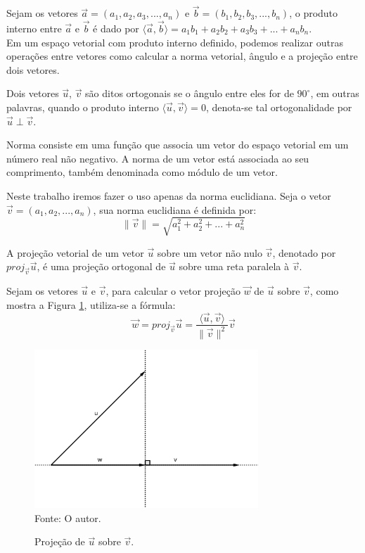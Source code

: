     Sejam os vetores $\vec{a} = (a_1,a_2,a_3,...,a_n)$ e $\vec{b} = (b_1,b_2,b_3,...,b_n)$, o produto interno entre $\vec{a}$ e $\vec{b}$ é dado por $\langle \vec{a}, \vec{b} \rangle = a_1 b_1 + a_2 b_2 + a_3 b_3 + ... + a_n b_n$.\\

    Em um espaço vetorial com produto interno definido, podemos realizar outras operações entre vetores como calcular a norma vetorial, ângulo e a projeção entre dois vetores.

\begin{definition}
    Dois vetores $\vec{u}$, $\vec{v}$ são ditos ortogonais se o ângulo entre eles for de $90^{\circ}$, em outras palavras, quando o produto interno $\langle \vec{u}, \vec{v} \rangle = 0$, denota-se tal ortogonalidade por $\vec{u} \perp \vec{v}$.
\end{definition}

\begin{definition}
    Norma consiste em uma função que associa um vetor do espaço vetorial em um número real não negativo. A norma de um vetor está associada ao seu comprimento, também denominada como módulo de um vetor.
\end{definition}

    Neste trabalho iremos fazer o uso apenas da norma euclidiana. Seja o vetor $\vec{v} = (a_1,a_2,...,a_n)$, sua norma euclidiana é definida por: $$\lVert \vec{v} \rVert = \sqrt{a_{1}^2 + a_{2}^2 + ... + a_{n}^2}$$

\begin{definition}
A projeção vetorial de um vetor $\vec{u}$ sobre um vetor não nulo $\vec{v}$, denotado por $proj_{\vec{v}}\Vec{u}$, é uma projeção ortogonal de $\vec{u}$ sobre uma reta paralela à $\vec{v}$.
\end{definition}

    Sejam os vetores $\vec{u}$ e $\vec{v}$, para calcular o vetor projeção $\vec{w}$ de $\vec{u}$ sobre $\vec{v}$, como mostra a Figura \ref{fig:projecao}, utiliza-se a fórmula: $$ \vec{w} = proj_{\vec{v}}\Vec{u} = \frac{\langle\vec{u}, \Vec{v}\rangle}{\lVert \Vec{v} \rVert^{2}}\Vec{v} $$

    \begin{figure}[htb!]
        \centering
        \caption{Projeção de $\vec{u}$ sobre $\vec{v}$.}
        \includegraphics[width=0.75\textwidth]{Figuras/projecao.png}\\
        \footnotesize{Fonte: O autor.}
        \label{fig:projecao}
    \end{figure}

